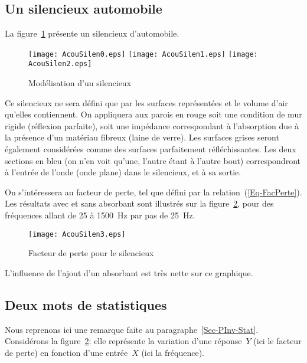 \medskip
\subsection{Un silencieux automobile}

La figure~\ref{Fig-AcouSilen} présente un silencieux d'automobile.
\begin{figure}[h!]
\centering
\texttt{[image: AcouSilen0.eps]}\hfill
\texttt{[image: AcouSilen1.eps]}\hfill
\texttt{[image: AcouSilen2.eps]}
\caption{Modélisation d'un silencieux}\label{Fig-AcouSilen}
\end{figure}
Ce silencieux ne sera défini que par les surfaces représentées et le volume d'air qu'elles contiennent. On appliquera aux parois en rouge soit une condition de mur rigide (réflexion parfaite), soit une impédance correspondant à l'absorption due à la présence d'un matériau fibreux (laine de verre). Les surfaces grises seront également considérées comme des surfaces parfaitement réfléchissantes. Les deux sections en bleu (on n'en voit qu'une, l'autre étant à l'autre bout) correspondront à l'entrée de l'onde (onde plane) dans le silencieux, et à sa sortie.

On s'intéressera au facteur de perte, tel que défini par la relation~(\ref{Eq-FacPerte}). Les résultats avec et sans absorbant sont illustrés sur la figure~\ref{Fig-AcouSilenRes}, pour des fréquences allant de 25 à 1500~Hz par pas de 25~Hz.
\begin{figure}[h!]
\centering
\texttt{[image: AcouSilen3.eps]}
\caption{Facteur de perte pour le silencieux}\label{Fig-AcouSilenRes}
\end{figure}
L'influence de l'ajout d'un absorbant est très nette sur ce graphique.

\medskip
\subsection{Deux mots de statistiques}

Nous reprenons ici une remarque faite au paragraphe~\ref{Sec-PInv-Stat}.
Considérons la figure~\ref{Fig-AcouSilenRes}: elle représente la variation d'une réponse~$Y$ (ici le facteur de perte) en fonction d'une entrée~$X$ (ici la fréquence).

